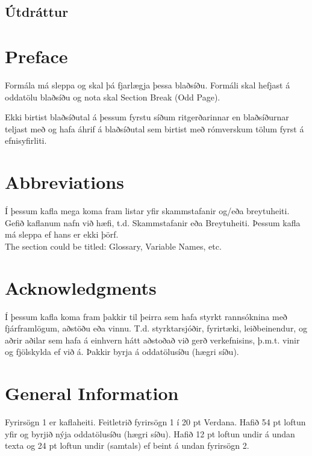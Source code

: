 \documentclass[a4paper,12pt,twoside,BCOR=10mm]{scrbook}
\begin{document}
\section*{\huge Útdráttur}

\vfill
\newpage

\chapter*{Preface}
Formála má sleppa og skal þá fjarlægja þessa blaðsíðu. Formáli skal hefjast á oddatölu blaðsíðu og nota skal Section Break (Odd Page).

Ekki birtist blaðsíðutal á þessum fyrstu síðum ritgerðarinnar en blaðsíðurnar teljast með og hafa áhrif á blaðsíðutal sem birtist með rómverskum tölum fyrst á efnisyfirliti.

\tableofcontents
\listoffigures
\listoftables

\chapter*{Abbreviations}
Í þessum kafla mega koma fram listar yfir skammstafanir og/eða breytuheiti. Gefið kaflanum nafn við hæfi, t.d. Skammstafanir eða Breytuheiti. Þessum kafla má sleppa ef hans er ekki þörf. \\

The section could be titled: Glossary, Variable Names, etc.

\chapter*{Acknowledgments}
Í þessum kafla koma fram þakkir til þeirra sem hafa styrkt rannsóknina með fjárframlögum, aðstöðu eða vinnu. T.d. styrktarsjóðir, fyrirtæki, leiðbeinendur, og aðrir aðilar sem hafa á einhvern hátt aðstoðað við gerð verkefnisins, þ.m.t. vinir og fjölskylda ef við á. Þakkir byrja á oddatölusíðu (hægri síðu).


\chapter{General Information}
\setcounter{page}{1}
Fyrirsögn 1 er kaflaheiti. Feitletrið fyrirsögn 1 í 20 pt Verdana. Hafið 54 pt loftun yfir og byrjið nýja oddatölusíðu (hægri síðu). Hafið 12 pt loftun undir á undan texta og 24 pt loftun undir (samtals) ef beint á undan fyrirsögn 2.
\end{document}
